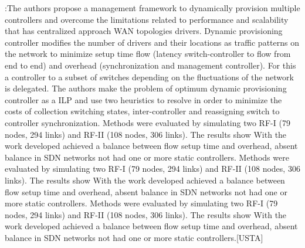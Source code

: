 \documentclass[a4paper,10pt]{article}
\begin{document}
\cite{BaRo13}:The authors propose a management framework to dynamically provision multiple controllers and overcome the limitations related to performance and scalability that has centralized approach WAN topologies drivers. Dynamic provisioning controller modifies the number of drivers and their locations as traffic patterns on the network to minimize setup time flow (latency switch-controller to flow from end to end) and overhead (synchronization and management controller). For this a controller to a subset of switches depending on the fluctuations of the network is delegated. The authors make the problem of optimum dynamic provisioning controller as a ILP and use two heuristics to resolve in order to minimize the costs of collection switching states, inter-controller and reassigning switch to controller synchronization. Methods were evaluated by simulating two RF-I (79 nodes, 294 links) and RF-II (108 nodes, 306 links). The results show With the work developed achieved a balance between flow setup time and overhead, absent balance in SDN networks not had one or more static controllers. Methods were evaluated by simulating two RF-I (79 nodes, 294 links) and RF-II (108 nodes, 306 links). The results show With the work developed achieved a balance between flow setup time and overhead, absent balance in SDN networks not had one or more static controllers. Methods were evaluated by simulating two RF-I (79 nodes, 294 links) and RF-II (108 nodes, 306 links). The results show With the work developed achieved a balance between flow setup time and overhead, absent balance in SDN networks not had one or more static controllers.[USTA]

\end{document}
